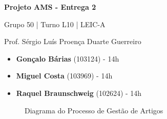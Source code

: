 \documentclass[12pt,a4paper]{article}
\begin{document}
\begin{titlepage}
  \begin{center}
    \vspace*{5cm}
    \Huge
    \textbf{Projeto AMS - Entrega 2}

    \vspace{0.5cm}
    \LARGE
    Grupo 50 | Turno L10 | LEIC-A

    \vspace{0.5cm}
    \large
    Prof. Sérgio Luís Proença Duarte Guerreiro

    \vfill
    \large
    \begin{minipage}{0.8\textwidth}
      \begin{itemize}
        \item[] \textbf{Gonçalo Bárias} (103124) - 14h
        \item[] \textbf{Miguel Costa} (103969) - 14h
        \item[] \textbf{Raquel Braunschweig} (102624) - 14h
      \end{itemize}
    \end{minipage}
  \end{center}
\end{titlepage}

%     
%
%     
%
%     

\begin{landscape}
  \begin{figure}
    \centering
    
    \caption{Diagrama do Processo de Gestão de Artigos}
    \label{fig:p2-fixed}
  \end{figure}
\end{landscape}
\end{document}
